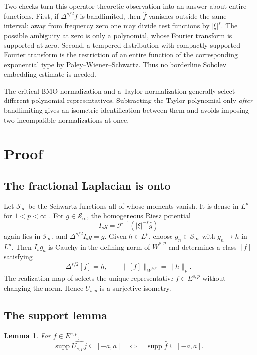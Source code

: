 \documentclass[11pt]{article}
\newtheorem{lemma}[theorem]{Lemma}
\newcommand{\cF}{\mathcal F}
\newcommand{\cS}{\mathcal S}
\newcommand{\supp}{\operatorname{supp}}
\begin{document}
Two checks turn this operator-theoretic observation into an answer about
entire functions. First, if $\Delta^{s/2}f$ is bandlimited, then
$\widehat f$ vanishes outside the same interval: away from frequency zero one
may divide test functions by $|\xi|^s$. The possible ambiguity at zero is only
a polynomial, whose Fourier transform is supported at zero. Second, a
tempered distribution with compactly supported Fourier transform is the
restriction of an entire function of the corresponding exponential type by
Paley--Wiener--Schwartz. Thus no borderline Sobolev embedding estimate is
needed.

The critical BMO normalization and a Taylor normalization generally select
different polynomial representatives. Subtracting the Taylor polynomial only
\emph{after} bandlimiting gives an isometric identification between them and
avoids imposing two incompatible normalizations at once.

\section{Proof}

\subsection{The fractional Laplacian is onto}

Let $\cS_\infty$ be the Schwartz functions all of whose moments vanish.
It is dense in $L^p$ for $1<p<\infty$ \cite{MPSReal}. For
$g\in\cS_\infty$, the homogeneous Riesz potential
\[
 I_sg=\cF^{-1}(|\xi|^{-s}\widehat g)
\]
again lies in $\cS_\infty$, and
$\Delta^{s/2}I_sg=g$. Given $h\in L^p$, choose
$g_n\in\cS_\infty$ with $g_n\to h$ in $L^p$. Then $I_sg_n$ is Cauchy in
the defining norm of $\dot W^{s,p}$ and determines a class $[f]$ satisfying
\[
 \Delta^{s/2}[f]=h,\qquad \|[f]\|_{\dot W^{s,p}}=\|h\|_p.
\]
The realization map of \cite{MPSReal} selects the unique representative
$f\in E^{s,p}$ without changing the norm. Hence $U_{s,p}$ is a surjective
isometry.

\subsection{The support lemma}

\begin{lemma}\label{lem:support}
For $f\in E^{s,p}$,
\[
 \supp\widehat{U_{s,p}f}\subseteq[-a,a]
 \quad\Longleftrightarrow\quad
 \supp\widehat f\subseteq[-a,a].
\]
\end{lemma}
\end{document}
